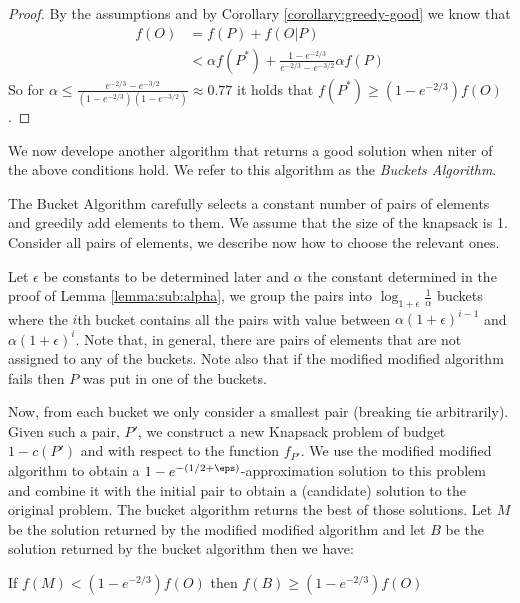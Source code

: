 \begin{proof}
	By the assumptions and by Corollary \ref{corollary:greedy-good} we know that 
	\begin{align}
		f(O)	& = f(P) + f(O|P) 
		\\ 		& < \alpha f(P^*) + \frac{1 - e^{-2/3}}{e^{-2/3} - e^{-3/2}} \alpha f(P)
	\end{align}
	So for $\alpha \leq \frac{e^{-2/3} - e^{-3/2}}{(1-e^{-2/3})(1-e^{-3/2})} \approx 0.77$ it holds that $f(P^*) \geq (1 - e^{-2/3})f(O)$.
\end{proof}

We now develope another algorithm that returns a good solution when niter of the above conditions hold.
We refer to this algorithm as the \emph{Buckets Algorithm}.

The Bucket Algorithm carefully selects a constant number of pairs of elements and greedily add elements to them.
We assume that the size of the knapsack is 1.
Consider all pairs of elements, we describe now how to choose the relevant ones.

Let $\epsilon$ be constants to be determined later and $\alpha$ the constant determined in the proof of Lemma \ref{lemma:sub:alpha},
we group the pairs into $\log_{1 + \epsilon}\frac{1}{\alpha}$ buckets where the $i$th bucket contains all the pairs with value
between $\alpha (1 + \epsilon)^{i - 1}$ and $\alpha (1 + \epsilon)^{i}$.
Note that, in general, there are pairs of elements that are not assigned to any of the buckets.
Note also that if the modified modified algorithm fails then $P$ was put in one of the buckets.

Now, from each bucket we only consider a smallest pair (breaking tie arbitrarily).
Given such a pair, $P'$, we construct a new Knapsack problem of budget $1 - c(P')$ and with respect to the function $f_{P'}$.
We use the modified modified algorithm to obtain a $1-e^{-(1/2 + \eps)}$-approximation
solution to this problem and combine it with the initial pair to obtain a (candidate)
solution to the original problem.
The bucket algorithm returns the best of those solutions.
Let $M$ be the solution returned by the modified modified algorithm and let $B$ be the solution returned by the bucket algorithm then we have:

\begin{lemma}
	If $f(M) < (1 - e^{-2/3})f(O)$ then $f(B) \geq (1 - e^{-2/3})f(O)$
\end{lemma}

